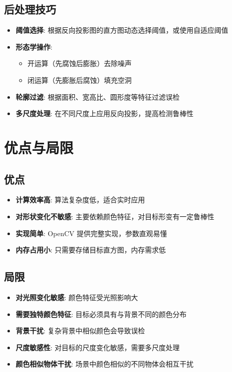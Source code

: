 \documentclass{article}
\begin{document}
\subsection{后处理技巧}
\begin{itemize}
    \item \textbf{阈值选择}: 根据反向投影图的直方图动态选择阈值，或使用自适应阈值
    \item \textbf{形态学操作}:
        \begin{itemize}
            \item 开运算（先腐蚀后膨胀）去除噪声
            \item 闭运算（先膨胀后腐蚀）填充空洞
        \end{itemize}
    \item \textbf{轮廓过滤}: 根据面积、宽高比、圆形度等特征过滤误检
    \item \textbf{多尺度处理}: 在不同尺度上应用反向投影，提高检测鲁棒性
\end{itemize}

\section{优点与局限}

\subsection{优点}
\begin{itemize}
    \item \textbf{计算效率高}: 算法复杂度低，适合实时应用
    \item \textbf{对形状变化不敏感}: 主要依赖颜色特征，对目标形变有一定鲁棒性
    \item \textbf{实现简单}: OpenCV 提供完整实现，参数直观易懂
    \item \textbf{内存占用小}: 只需要存储目标直方图，内存需求低
\end{itemize}

\subsection{局限}
\begin{itemize}
    \item \textbf{对光照变化敏感}: 颜色特征受光照影响大
    \item \textbf{需要独特颜色特征}: 目标必须具有与背景不同的颜色分布
    \item \textbf{背景干扰}: 复杂背景中相似颜色会导致误检
    \item \textbf{尺度敏感性}: 对目标的尺度变化敏感，需要多尺度处理
    \item \textbf{颜色相似物体干扰}: 场景中颜色相似的不同物体会相互干扰
\end{itemize}
\end{document}
